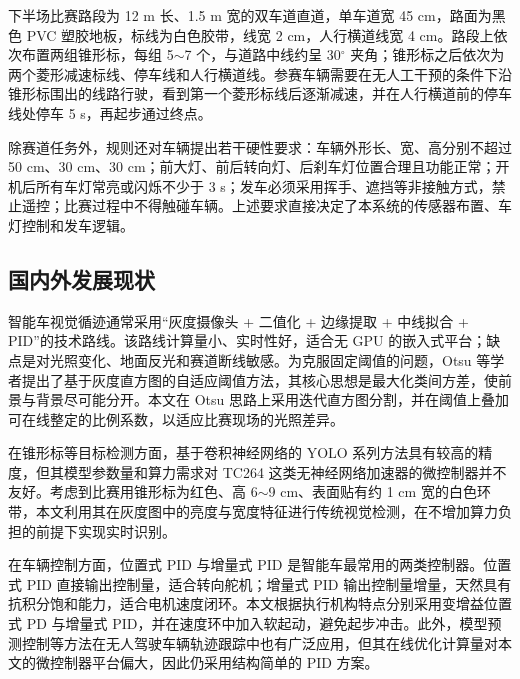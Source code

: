 \documentclass{MaiTechReport}
\begin{document}
下半场比赛路段为 12 m 长、1.5 m 宽的双车道直道，单车道宽 45 cm，路面为黑色 PVC 塑胶地板，标线为白色胶带，线宽 2 cm，人行横道线宽 4 cm。路段上依次布置两组锥形标，每组 5$\sim$7 个，与道路中线约呈 30$^\circ$ 夹角；锥形标之后依次为两个菱形减速标线、停车线和人行横道线。参赛车辆需要在无人工干预的条件下沿锥形标围出的线路行驶，看到第一个菱形标线后逐渐减速，并在人行横道前的停车线处停车 5 s，再起步通过终点。

除赛道任务外，规则还对车辆提出若干硬性要求：车辆外形长、宽、高分别不超过 50 cm、30 cm、30 cm；前大灯、前后转向灯、后刹车灯位置合理且功能正常；开机后所有车灯常亮或闪烁不少于 3 s；发车必须采用挥手、遮挡等非接触方式，禁止遥控；比赛过程中不得触碰车辆。上述要求直接决定了本系统的传感器布置、车灯控制和发车逻辑。

\subsection{国内外发展现状}
智能车视觉循迹通常采用“灰度摄像头 + 二值化 + 边缘提取 + 中线拟合 + PID”的技术路线。该路线计算量小、实时性好，适合无 GPU 的嵌入式平台；缺点是对光照变化、地面反光和赛道断线敏感。为克服固定阈值的问题，Otsu 等学者提出了基于灰度直方图的自适应阈值方法，其核心思想是最大化类间方差，使前景与背景尽可能分开。本文在 Otsu 思路上采用迭代直方图分割，并在阈值上叠加可在线整定的比例系数，以适应比赛现场的光照差异。

在锥形标等目标检测方面，基于卷积神经网络的 YOLO 系列方法具有较高的精度，但其模型参数量和算力需求对 TC264 这类无神经网络加速器的微控制器并不友好。考虑到比赛用锥形标为红色、高 6$\sim$9 cm、表面贴有约 1 cm 宽的白色环带，本文利用其在灰度图中的亮度与宽度特征进行传统视觉检测，在不增加算力负担的前提下实现实时识别。

在车辆控制方面，位置式 PID 与增量式 PID 是智能车最常用的两类控制器。位置式 PID 直接输出控制量，适合转向舵机；增量式 PID 输出控制量增量，天然具有抗积分饱和能力，适合电机速度闭环。本文根据执行机构特点分别采用变增益位置式 PD 与增量式 PID，并在速度环中加入软起动，避免起步冲击。此外，模型预测控制等方法在无人驾驶车辆轨迹跟踪中也有广泛应用，但其在线优化计算量对本文的微控制器平台偏大，因此仍采用结构简单的 PID 方案。
\end{document}
